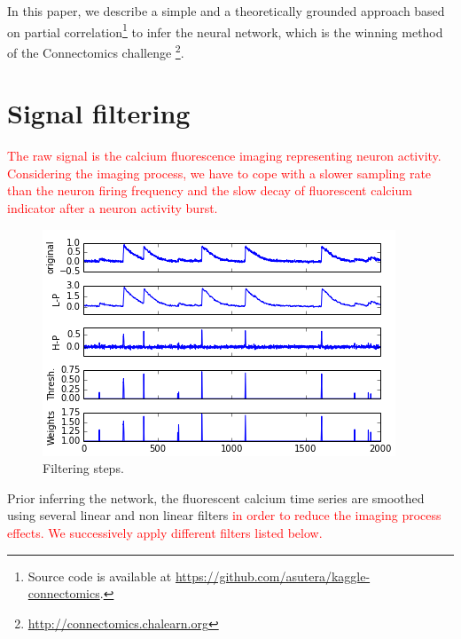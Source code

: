 \documentclass[wcp]{jmlr}
\begin{document}
In this paper, we describe a simple and a theoretically grounded approach
based on partial correlation\footnote{Source code is available at
\url{https://github.com/asutera/kaggle-connectomics}.} to infer the neural
network, which is the winning method of the Connectomics challenge
\footnote{\url{http://connectomics.chalearn.org}}.


\section{Signal filtering} \label{sec:filter}




\textcolor{red}{The raw signal is the calcium fluorescence imaging representing
neuron activity. Considering the imaging process, we have to cope with a slower
sampling rate than the neuron firing frequency and the slow decay of fluorescent
calcium indicator after a neuron activity burst.}


\begin{figure}
\caption{Filtering steps.}\label{wrap-fig:1}
\includegraphics[width=\linewidth]{images/fig_filtering_recut.png}
\end{figure}


Prior inferring the network, the fluorescent calcium time series
are smoothed using several linear and non linear filters \textcolor{red}{in
order to reduce the imaging process effects. We successively apply different
filters listed below.} \\
\end{document}
